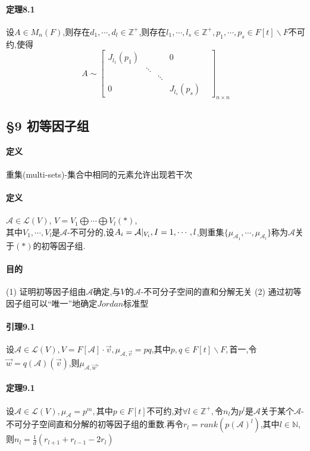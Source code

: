 \documentclass{ctexart}
\begin{document}
\paragraph{定理8.1}
设$A\in M_{n}(F)$,则存在$d_{1},\cdots,d_{l}\in \mathbb{Z}^{+}$,则存在$l_{1},\cdots,l_{s} \in \mathbb{Z}^{+},p_{1},\cdots,p_{s} \in F[t]\backslash F$不可约,使得
$$
 A \sim
 \left[
 \begin{matrix}
  J_{l_{1}}(p_{1}) &   &   & 0 \\
    & \ddots &   &   & \\
     &   & \ddots &   &  \\
  0 &   &    & J_{l_{s}}(p_{s})
  \end{matrix}
  \right]_{n\times n}
$$

\subsection{§9 初等因子组}

\paragraph{定义}

重集(multi-sets)-集合中相同的元素允许出现若干次

\paragraph{定义}

$\mathcal{A} \in \mathcal{L}(V)$,
$V=V_{1}\bigoplus \cdots \bigoplus V_{l} (*)$,\\
其中$V_{1},\cdots,V_{l}$是$\mathcal{A}$-不可分的,设$A_{i}=\mathcal{A}\arrowvert_{V_{i}},I=1,\cdots,l$,则重集$\{ \mu_{\mathcal{A}_{1}},\cdots,\mu_{\mathcal{A}_{l}}\}$称为$\mathcal{A}$关于$(*)$的初等因子组.

\paragraph{目的}

(1) 证明初等因子组由$\mathcal{A}$确定,与$V$的$\mathcal{A}$-不可分子空间的直和分解无关
(2) 通过初等因子组可以“唯一”地确定$Jordan$标准型

\paragraph{引理9.1}

设$\mathcal{A} \in \mathcal{L}(V),V=F[\mathcal{A}] \cdot \vec{v},\mu_{\mathcal{A},\vec{v}}=pq$,其中$p,q \in F[t] \backslash F,$首一,令$\vec{w}=q(\mathcal{A})(\vec{v})$,则$\mu_{\mathcal{A},\vec{w}}$.

\paragraph{定理9.1}

设$\mathcal{A} \in \mathcal{L}(V),\mu_{\mathcal{A}}=p^{m},$其中$p \in F[t]$不可约,对$\forall l \in \mathbb{Z}^{+},$令$n_{l}$为$p^{l}$是$\mathcal{A}$关于某个$\mathcal{A}$-不可分子空间直和分解的初等因子组的重数.再令$r_{l}=rank(p(\mathcal{A})^{l})$,其中$l \in \mathbb{N}$,则$n_{l}=\frac{1}{d}(r_{l+1}+r_{l-1}-2r_{l})$

\ifx\total\undefined
\end{document}
